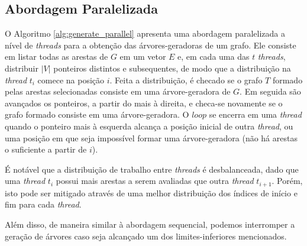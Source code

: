 \documentclass[article,a4paper,12pt,brazil,sumario=tradicional]{abntex2}
\theoremstyle{definition} %
\begin{document}
\subsection{Abordagem Paralelizada}
\label{abordagem-paralelizada}

O Algoritmo \ref{alg:generate_parallel} apresenta uma abordagem paralelizada a nível de \textit{threads} para a obtenção das árvores-geradoras de um grafo. Ele consiste em listar todas as arestas de $G$ em um vetor $E$ e, em cada uma das $t$ \textit{threads}, distribuir $|V|$ ponteiros distintos e subsequentes, de modo que a distribuição na \textit{thread} $t_i$ comece na posição $i$. Feita a distribuição, é checado se o grafo $T$ formado pelas arestas selecionadas consiste em uma árvore-geradora de $G$. Em seguida são avançados os ponteiros, a partir do mais à direita, e checa-se novamente se o grafo formado consiste em uma árvore-geradora. O $loop$ se encerra em uma \textit{thread} quando o ponteiro mais à esquerda alcança a posição inicial de outra \textit{thread}, ou uma posição em que seja impossível formar uma árvore-geradora (não há arestas o suficiente a partir de $i$).

É notável que a distribuição de trabalho entre \textit{threads} é desbalanceada, dado que uma \textit{thread} $t_i$ possui mais arestas a serem avaliadas que outra \textit{thread} $t_{i+1}$. Porém, isto pode ser mitigado através de uma melhor distribuição dos índices de início e fim para cada \textit{thread}.

Além disso, de maneira similar à abordagem sequencial, podemos interromper a geração de árvores caso seja alcançado um dos limites-inferiores mencionados.




\end{document}
